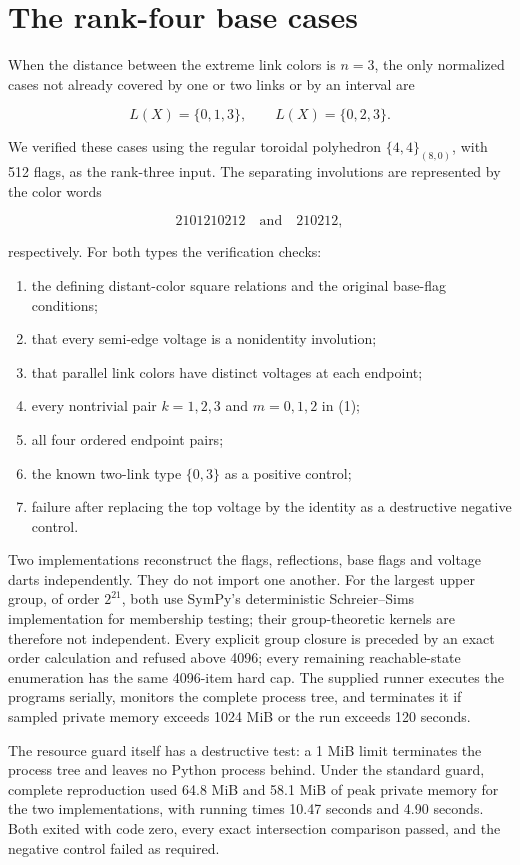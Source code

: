 \documentclass[11pt]{article}
\begin{document}
\section{The rank-four base cases}

When the distance between the extreme link colors is $n=3$, the only normalized cases not already
covered by one or two links or by an interval are

\[
L(X)=\{0,1,3\},\qquad L(X)=\{0,2,3\}.
\tag{10}
\]

We verified these cases using the regular toroidal polyhedron $\{4,4\}_{(8,0)}$, with 512 flags, as
the rank-three input. The separating involutions are represented by the color words

\[
2101210212\quad\text{and}\quad210212,
\]

respectively. For both types the verification checks:

\begin{enumerate}
\item the defining distant-color square relations and the original base-flag conditions;
\item that every semi-edge voltage is a nonidentity involution;
\item that parallel link colors have distinct voltages at each endpoint;
\item every nontrivial pair $k=1,2,3$ and $m=0,1,2$ in (1);
\item all four ordered endpoint pairs;
\item the known two-link type $\{0,3\}$ as a positive control;
\item failure after replacing the top voltage by the identity as a destructive negative control.
\end{enumerate}

Two implementations reconstruct the flags, reflections, base flags and voltage darts independently.
They do not import one another. For the largest upper group, of order $2^{21}$, both use SymPy's
deterministic Schreier--Sims implementation for membership testing; their group-theoretic kernels
are therefore not independent. Every explicit group closure is preceded by an exact order
calculation and refused above 4096; every remaining reachable-state enumeration has the same
4096-item hard cap. The supplied runner executes the programs serially, monitors the complete
process tree, and terminates it if sampled private memory exceeds 1024 MiB or the run exceeds
120 seconds.

The resource guard itself has a destructive test: a 1 MiB limit terminates the process tree and
leaves no Python process behind. Under the standard guard, complete reproduction used 64.8 MiB and
58.1 MiB of peak private memory for the two implementations, with running times 10.47 seconds and
4.90 seconds. Both exited with code zero, every exact intersection comparison passed, and the
negative control failed as required.
\end{document}
